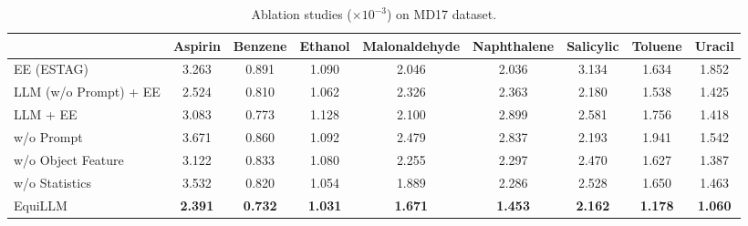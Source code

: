 \begin{table*}[!t]
\vspace{-0.5cm}
\centering
\caption{Ablation studies ($\times 10^{-3}$) on MD17 dataset.}
\label{table:md17_ablation}
\tabcolsep=0.16cm
\begin{tabular}{lcccccccc}
\toprule
 & Aspirin  & Benzene & Ethanol & Malonaldehyde & Naphthalene & Salicylic & Toluene & Uracil\\
\midrule
\addlinespace[0.3em]
EE (ESTAG) &3.263	&0.891	&1.090	&2.046 &2.036 &3.134	&1.634	&1.852\\
\addlinespace[0.3em]
LLM (w/o Prompt) + EE &2.524	&0.810	&1.062	&2.326	&2.363	&2.180	&1.538	&1.425\\
\addlinespace[0.3em]
LLM + EE &3.083	&0.773 &1.128	&2.100	&2.899	&2.581	&1.756	&1.418\\
\midrule
\addlinespace[0.3em]
w/o Prompt &3.671 &0.860	&1.092	&2.479	&2.837	&2.193	&1.941	&1.542\\
\addlinespace[0.3em]
w/o Object Feature &3.122	&0.833	&1.080	&2.255	&2.297	&2.470	&1.627	&1.387\\
\addlinespace[0.3em]
w/o Statistics & 3.532	&0.820	&1.054	&1.889	& 2.286 &2.528	&1.650 &1.463\\
\midrule
\addlinespace[0.3em]
EquiLLM &\textbf{2.391}	&\textbf{0.732}	&\textbf{1.031}	&\textbf{1.671}&\textbf{1.453}	&\textbf{2.162}&\textbf{1.178}	&\textbf{1.060}\\
\bottomrule
\end{tabular}
\vspace{-0.5cm}
\end{table*}
